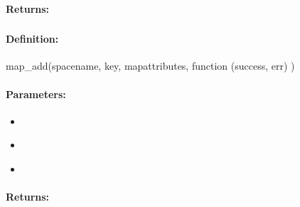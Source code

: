 \paragraph{Returns:}


\pagebreak
\subsubsection{}
\label{api:nodejs:map_add}


\paragraph{Definition:}
\begin{javascriptcode}
map_add(spacename, key, mapattributes, function (success, err) {})
\end{javascriptcode}
\paragraph{Parameters:}
\begin{itemize}[noitemsep]
\item {}\\

\item {}\\

\item {}\\

\end{itemize}

\paragraph{Returns:}


\pagebreak
\subsubsection{}
\label{api:nodejs:cond_map_add}


